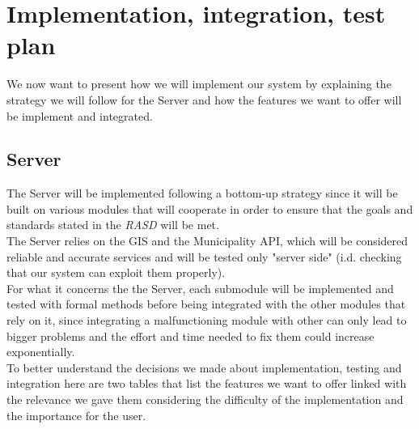 \setlength{\parindent}{4ex}
\setlength{\parskip}{1ex}

\section{Implementation, integration, test plan}
    We now want to present how we will implement our system by explaining the strategy we will follow for the Server
    and how the features we want to offer will be implement and integrated.
        
        \subsection{Server}
        The Server will be implemented following a bottom-up strategy since it will be built on various modules that will cooperate in order
        to ensure that the goals and standards stated in the \emph{RASD} \cite{RASD} will be met.\\
        The Server relies on the GIS and the Municipality API, which will be considered reliable and accurate services and will be
        tested only "server side" (i.d. checking that our system can exploit them properly).\\
        For what it concerns the the Server, each submodule will be implemented and tested with formal methods before being integrated 
        with the other modules that rely on it, since integrating a malfunctioning module with other can only lead to bigger problems 
        and the effort and time needed to fix them could increase exponentially.\\
        To better understand the decisions we made about implementation, testing and integration here are two tables that list the features
        we want to offer linked with the relevance we gave them considering the difficulty of the implementation and the importance for 
        the user.\\ 
        
